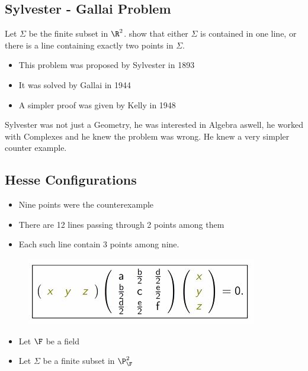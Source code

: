\documentclass{article}
\begin{document}
\subsection{Sylvester - Gallai Problem}
\begin{problem}
  Let $\Sigma$ be the finite subset in $\R^2$. show that either $\Sigma$ is contained in one line, or there is a line containing exactly two points in $\Sigma$.
\end{problem}
\begin{itemize}
  \item This problem was proposed by Sylvester in 1893
  \item It was solved by Gallai in 1944
  \item A simpler proof was given by Kelly in 1948
\end{itemize}

Sylvester was not just a Geometry, he was interested in Algebra aswell, he worked with Complexes and he knew the problem was wrong. He knew a very simpler counter example.\\

\subsection{Hesse Configurations}


\begin{itemize}
  \item Nine points were the counterexample
  \item There are 12 lines passing through 2 points among them
  \item Each such line contain 3 points among nine.
\end{itemize}

\begin{figure}[!ht]
\centering
\includegraphics{./figures/L2.1}
\end{figure}

\begin{itemize}
  \item Let $\F$ be a field
  \item Let $\Sigma$ be a finite subset in $\P_\F^2$
\end{itemize}
\end{document}
